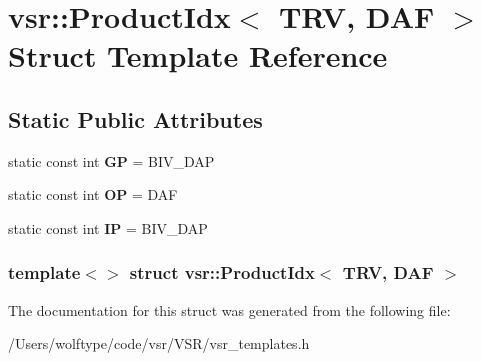 \hypertarget{structvsr_1_1_product_idx_3_01_t_r_v_00_01_d_a_f_01_4}{\section{vsr\-:\-:Product\-Idx$<$ T\-R\-V, D\-A\-F $>$ Struct Template Reference}
\label{structvsr_1_1_product_idx_3_01_t_r_v_00_01_d_a_f_01_4}
}
\subsection*{Static Public Attributes}
\begin{DoxyCompactItemize}
\item 
\hypertarget{structvsr_1_1_product_idx_3_01_t_r_v_00_01_d_a_f_01_4_aa0b323cc388234aaebbcc768c5444d35}{static const int {\bfseries G\-P} = B\-I\-V\-\_\-\-D\-A\-P}\label{structvsr_1_1_product_idx_3_01_t_r_v_00_01_d_a_f_01_4_aa0b323cc388234aaebbcc768c5444d35}

\item 
\hypertarget{structvsr_1_1_product_idx_3_01_t_r_v_00_01_d_a_f_01_4_a41fe55800a701738ba5c4eb70527c53b}{static const int {\bfseries O\-P} = D\-A\-F}\label{structvsr_1_1_product_idx_3_01_t_r_v_00_01_d_a_f_01_4_a41fe55800a701738ba5c4eb70527c53b}

\item 
\hypertarget{structvsr_1_1_product_idx_3_01_t_r_v_00_01_d_a_f_01_4_a2dc58047494e6bb6d7f82fc328f492cb}{static const int {\bfseries I\-P} = B\-I\-V\-\_\-\-D\-A\-P}\label{structvsr_1_1_product_idx_3_01_t_r_v_00_01_d_a_f_01_4_a2dc58047494e6bb6d7f82fc328f492cb}

\end{DoxyCompactItemize}
\subsubsection*{template$<$$>$ struct vsr\-::\-Product\-Idx$<$ T\-R\-V, D\-A\-F $>$}



The documentation for this struct was generated from the following file\-:\begin{DoxyCompactItemize}
\item 
/\-Users/wolftype/code/vsr/\-V\-S\-R/vsr\-\_\-templates.\-h\end{DoxyCompactItemize}
